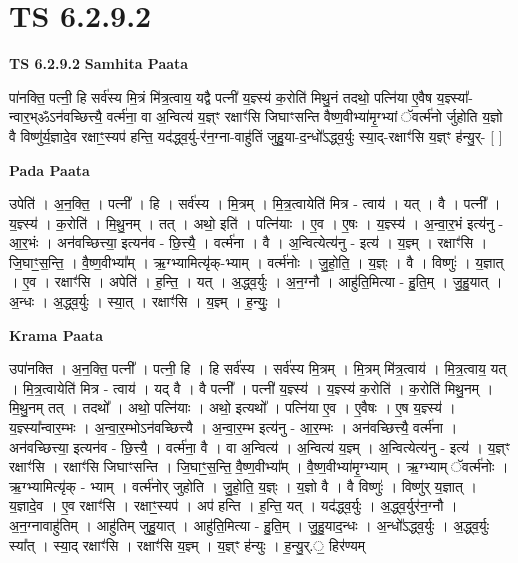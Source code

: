 \documentclass[17pt]{extarticle}
\begin{document}
\section{ TS 6.2.9.2 }

\textbf{TS 6.2.9.2 } \newline
\textbf{Samhita Paata} \newline

पा॑नक्ति॒ पत्नी॒ हि सर्व॑स्य मि॒त्रं मि॑त्र॒त्वाय॒ यद्वै पत्नी॑ य॒ज्ञ्स्य॑ क॒रोति॑ मिथु॒नं तदथो॒ पत्नि॑या ए॒वैष य॒ज्ञ्स्या᳚-न्वार॒भ्ॐऽन॑वच्छित्त्यै॒ वर्त्म॑ना॒ वा अ॒न्वित्य॑ य॒ज्ञ्ꣳ रक्षाꣳ॑सि जिघाꣳसन्ति वैष्ण॒वीभ्या॑मृ॒ग्भ्यां ॅवर्त्म॑नो र्जुहोति य॒ज्ञो वै विष्णु॑र्य॒ज्ञादे॒व रक्षाꣳ॒॒स्यप॑ हन्ति॒ यद॑द्ध्व॒र्यु-र॑न॒ग्ना-वाहु॑तिं जुहु॒या-द॒न्धो᳚ऽद्ध्व॒र्युः स्या॒द्-रक्षाꣳ॑सि य॒ज्ञ्ꣳ ह॑न्यु॒र्- [  ] \newline

\textbf{Pada Paata} \newline

उपेति॑ । अ॒न॒क्ति॒ । पत्नी᳚ । हि । सर्व॑स्य । मि॒त्रम् । मि॒त्र॒त्वायेति॑ मित्र - त्वाय॑ । यत् । वै । पत्नी᳚ । य॒ज्ञ्स्य॑ । क॒रोति॑ । मि॒थु॒नम् । तत् । अथो॒ इति॑ । पत्नि॑याः । ए॒व । ए॒षः । य॒ज्ञ्स्य॑ । अ॒न्वा॒र॒भं इत्य॑नु - आ॒र॒भंः । अन॑वच्छित्त्या॒ इत्यन॑व - छि॒त्त्यै॒ । वर्त्म॑ना । वै । अ॒न्वित्येत्य॑नु - इत्य॑ । य॒ज्ञ्म् । रक्षाꣳ॑सि । जि॒घाꣳ॒॒स॒न्ति॒ । वै॒ष्ण॒वीभ्या᳚म् । ऋ॒ग्भ्यामित्यृ॑क्-भ्याम् । वर्त्म॑नोः । जु॒हो॒ति॒ । य॒ज्ञ्ः । वै । विष्णुः॑ । य॒ज्ञात् । ए॒व । रक्षाꣳ॑सि । अपेति॑ । ह॒न्ति॒ । यत् । अ॒द्ध्व॒र्युः । अ॒न॒ग्नौ । आहु॑ति॒मित्या - हु॒ति॒म् । जु॒हु॒यात् । अ॒न्धः । अ॒द्ध्व॒र्युः । स्या॒त् । रक्षाꣳ॑सि । य॒ज्ञ्म् । ह॒न्युः॒ ।  \newline


\textbf{Krama Paata} \newline

उपा॑नक्ति । अ॒न॒क्ति॒ पत्नी᳚ । पत्नी॒ हि । हि सर्व॑स्य । सर्व॑स्य मि॒त्रम् । मि॒त्रम् मि॑त्र॒त्वाय॑ । मि॒त्र॒त्वाय॒ यत् । मि॒त्र॒त्वायेति॑ मित्र - त्वाय॑ । यद् वै । वै पत्नी᳚ । पत्नी॑ य॒ज्ञ्स्य॑ । य॒ज्ञ्स्य॑ क॒रोति॑ । क॒रोति॑ मिथु॒नम् । मि॒थु॒नम् तत् । तदथो᳚ । अथो॒ पत्नि॑याः । अथो॒ इत्यथो᳚ । पत्नि॑या ए॒व । ए॒वैषः । ए॒ष य॒ज्ञ्स्य॑ । य॒ज्ञ्स्या᳚न्वार॒म्भः । अ॒न्वा॒र॒म्भोऽन॑वच्छित्त्यै । अ॒न्वा॒र॒म्भ इत्य॑नु - आ॒र॒म्भः । अन॑वच्छित्त्यै॒ वर्त्म॑ना । अन॑वच्छित्त्या॒ इत्यन॑व - छि॒त्त्यै॒ । वर्त्म॑ना॒ वै । वा अ॒न्वित्य॑ । अ॒न्वित्य॑ य॒ज्ञ्म् । अ॒न्वित्येत्य॑नु - इत्य॑ । य॒ज्ञ्ꣳ रक्षाꣳ॑सि । रक्षाꣳ॑सि जिघाꣳसन्ति । जि॒घाꣳ॒॒स॒न्ति॒ वै॒ष्ण॒वीभ्या᳚म् । वै॒ष्ण॒वीभ्या॑मृ॒ग्भ्याम् । ऋ॒ग्भ्याम् ॅवर्त्म॑नोः । ऋ॒ग्भ्यामित्यृ॑क् - भ्याम् । वर्त्म॑नोर् जुहोति । जु॒हो॒ति॒ य॒ज्ञ्ः । य॒ज्ञो वै । वै विष्णुः॑ । विष्णु॑र् य॒ज्ञात् । य॒ज्ञादे॒व । ए॒व रक्षाꣳ॑सि । रक्षाꣳ॒॒स्यप॑ । अप॑ हन्ति । ह॒न्ति॒ यत् । यद॑द्ध्व॒र्युः । अ॒द्ध्व॒र्युर॑न॒ग्नौ । अ॒न॒ग्नावाहु॑तिम् । आहु॑तिम् जुहु॒यात् । आहु॑ति॒मित्या - हु॒ति॒म् । जु॒हु॒याद॒न्धः । अ॒न्धो᳚ऽद्ध्व॒र्युः । अ॒द्ध्व॒र्युः स्या᳚त् । स्या॒द् रक्षाꣳ॑सि । रक्षाꣳ॑सि य॒ज्ञ्म् । य॒ज्ञ्ꣳ ह॑न्युः । ह॒न्यु॒र्.॒ हिर॑ण्यम् \newline
\end{document}
